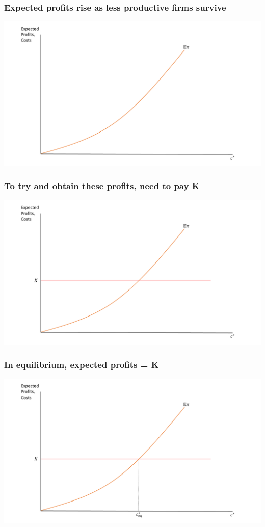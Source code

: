 \documentclass{beamer}
\begin{document}
\begin{frame}
	\frametitle{Expected profits rise as less productive firms survive}
		\includegraphics[scale=0.32]{SL3_3.pdf}
\end{frame}

\begin{frame}
	\frametitle{To try and obtain these profits, need to pay K}
	\includegraphics[scale=0.32]{SL3_4.pdf}
\end{frame}

\begin{frame}
	\frametitle{In equilibrium, expected profits = K}
	\includegraphics[scale=0.32]{SL3_5.pdf}
\end{frame}
\end{document}
